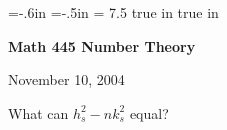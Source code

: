 \def\cmb{\MidnightBlue}	  %
\def\cnb{\NavyBlue}	  %
\def\crb{\RoyalBlue}	  %
\def\cce{\Cerulean}	  %
\def\ccy{\Cyan}		  %
\def\cpb{\ProcessBlue}	  %
\def\csb{\SkyBlue}	  %
\def\ctu{\Turquoise}	  %
\def\ctb{\TealBlue}	  %
\def\caq{\Aquamarine}	  %
\def\cbg{\BlueGreen}	  %
\def\cem{\Emerald}	  %
\def\cjg{\JungleGreen}	  %
\def\csg{\SeaGreen}	  %
\def\cgg{\Green}	  %
\def\cfg{\ForestGreen}	  %
\def\cpg{\PineGreen}	  %
\def\clg{\LimeGreen}	  %
\def\cyg{\YellowGreen}	  %
\def\cspg{\SpringGreen}	  %
\def\cog{\OliveGreen}	  %
\def\pars{\RawSienna}	  %
\def\cse{\Sepia}		  %
\def\cbr{\Brown}		  %
\def\cta{\Tan}		  %
\def\cgr{\Gray}		  %
\def\cbl{\Black}		  %
\def\cwh{\White}		  %


\voffset=-.6in
\hoffset=-.5in
\hsize = 7.5 true in
 true in


\overfullrule=0pt


\def\ctln{\centerline}
\def\u{\underbar}
\def\ssk{\smallskip}
\def\msk{\medskip}
\def\bsk{\bigskip}
\def\hsk{\hskip.1in}
\def\hhsk{\hskip.2in}
\def\dsl{\displaystyle}
\def\hskp{\hskip1.5in}

\def\lra{$\Leftrightarrow$ }


\ctln{\bf Math 445 Number Theory}

\smallskip

\ctln{November 10, 2004}

\medskip

What can $h_s^2-nk_s^2$ equal?

